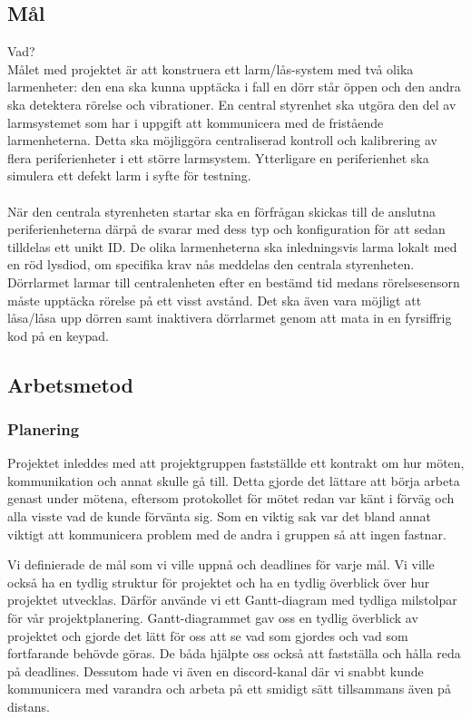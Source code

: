 \documentclass{article}
\begin{document}
\subsection{Mål}
Vad?
\\
Målet med projektet är att konstruera ett larm/lås-system med två olika larmenheter: 
den ena ska kunna upptäcka i fall en dörr står öppen och den andra ska detektera rörelse och vibrationer. 
En central styrenhet ska utgöra den del av larmsystemet som har i uppgift att kommunicera med de fristående larmenheterna. 
Detta ska möjliggöra centraliserad kontroll och kalibrering av flera periferienheter i ett större larmsystem. 
Ytterligare en periferienhet ska simulera ett defekt larm i syfte för testning.
\\\\
När den centrala styrenheten startar ska en förfrågan skickas till de anslutna periferienheterna därpå de svarar med dess typ och konfiguration för att sedan tilldelas ett unikt ID. De olika larmenheterna ska inledningsvis larma lokalt med en röd lysdiod, om specifika krav nås meddelas den centrala styrenheten. Dörrlarmet larmar till centralenheten efter en bestämd tid medans rörelsesensorn måste upptäcka rörelse på ett visst avstånd. Det ska även vara möjligt att låsa/låsa upp dörren samt inaktivera dörrlarmet genom att mata in en fyrsiffrig kod på en keypad.


\subsection{Arbetsmetod}


\subsubsection{Planering}
Projektet inleddes med att projektgruppen fastställde ett kontrakt om hur möten, kommunikation och annat skulle gå till. Detta gjorde det lättare att börja arbeta genast under mötena, eftersom protokollet för mötet redan var känt i förväg och alla visste vad de kunde förvänta sig. Som en viktig sak var det bland annat viktigt att kommunicera problem med de andra i gruppen så att ingen fastnar.

Vi definierade de mål som vi ville uppnå och deadlines för varje mål. Vi ville också ha en tydlig struktur för projektet och ha en tydlig överblick över hur projektet utvecklas. Därför använde vi ett Gantt-diagram med tydliga milstolpar för vår projektplanering. Gantt-diagrammet gav oss en tydlig överblick av projektet och gjorde det lätt för oss att se vad som gjordes och vad som fortfarande behövde göras. De båda hjälpte oss också att fastställa och hålla reda på deadlines. Dessutom hade vi även en discord-kanal där vi snabbt kunde kommunicera med varandra och arbeta på ett smidigt sätt tillsammans även på distans.
\end{document}
